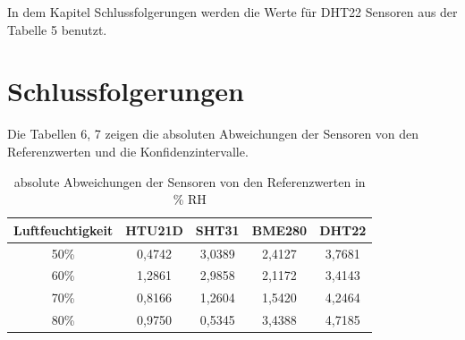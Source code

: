 \documentclass[runningheads]{llncs}
\begin{document}
\begin{table}[!h]
\centering
\caption{Stichprobenanalyse DHT22 ohne das erste Exemplar, \% RH}
\label{tab:my-table}
\end{table}
In dem Kapitel Schlussfolgerungen werden die Werte für DHT22 Sensoren aus der Tabelle 5 benutzt.
\section{Schlussfolgerungen}
Die Tabellen 6, 7 zeigen die absoluten Abweichungen der Sensoren von den Referenzwerten und die Konfidenzintervalle.
\begin{table}[h]
\centering
\caption{absolute Abweichungen der Sensoren von den Referenzwerten in \% RH}
\begin{tabular}{|c|c|c|c|c|}
\hline
Luftfeuchtigkeit & HTU21D & SHT31  & BME280 & DHT22  \\ \hline
50\%             & 0,4742  & 3,0389 & 2,4127 & 3,7681 \\ \hline
60\%             & 1,2861  & 2,9858 & 2,1172 & 3,4143 \\ \hline
70\%             & 0,8166  & 1,2604 & 1,5420 & 4,2464 \\ \hline
80\%             & 0,9750  & 0,5345 & 3,4388 & 4,7185 \\ \hline
\end{tabular}
\end{table}
\end{document}
